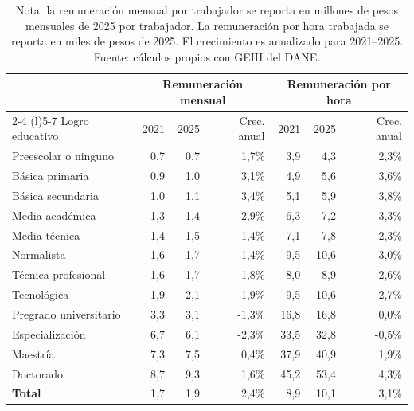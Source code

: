 \begin{table}[H]
\centering
\caption{Remuneración laboral por logro educativo detallado, 2021 y 2025}
\label{tab:remuneracion_educacion_detallada_trabajador}
\label{tab:remuneracion_educacion_detallada}
\scriptsize
\setlength{\tabcolsep}{3pt}
\begin{tabular}{@{}p{3.6cm}rrrrrr@{}}
\toprule
& \multicolumn{3}{c}{Remuneración mensual} & \multicolumn{3}{c}{Remuneración por hora} \\
\cmidrule(lr){2-4} \cmidrule(l){5-7}
Logro educativo & 2021 & 2025 & Crec. anual & 2021 & 2025 & Crec. anual \\
\midrule
Preescolar o ninguno & 0,7 & 0,7 & 1,7\% & 3,9 & 4,3 & 2,3\% \\
Básica primaria & 0,9 & 1,0 & 3,1\% & 4,9 & 5,6 & 3,6\% \\
Básica secundaria & 1,0 & 1,1 & 3,4\% & 5,1 & 5,9 & 3,8\% \\
Media académica & 1,3 & 1,4 & 2,9\% & 6,3 & 7,2 & 3,3\% \\
Media técnica & 1,4 & 1,5 & 1,4\% & 7,1 & 7,8 & 2,3\% \\
Normalista & 1,6 & 1,7 & 1,4\% & 9,5 & 10,6 & 3,0\% \\
Técnica profesional & 1,6 & 1,7 & 1,8\% & 8,0 & 8,9 & 2,6\% \\
Tecnológica & 1,9 & 2,1 & 1,9\% & 9,5 & 10,6 & 2,7\% \\
Pregrado universitario & 3,3 & 3,1 & -1,3\% & 16,8 & 16,8 & 0,0\% \\
Especialización & 6,7 & 6,1 & -2,3\% & 33,5 & 32,8 & -0,5\% \\
Maestría & 7,3 & 7,5 & 0,4\% & 37,9 & 40,9 & 1,9\% \\
Doctorado & 8,7 & 9,3 & 1,6\% & 45,2 & 53,4 & 4,3\% \\
\midrule
\textbf{Total} & 1,7 & 1,9 & 2,4\% & 8,9 & 10,1 & 3,1\% \\
\bottomrule
\end{tabular}
\caption*{\footnotesize Nota: la remuneración mensual por trabajador se reporta en millones de pesos mensuales de 2025 por trabajador. La remuneración por hora trabajada se reporta en miles de pesos de 2025. El crecimiento es anualizado para 2021--2025. Fuente: cálculos propios con GEIH del DANE.}
\end{table}
